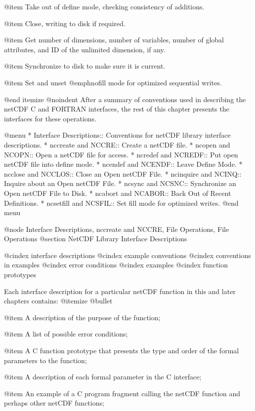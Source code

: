 @item
Take out of define mode, checking consistency of additions.

@item
Close, writing to disk if required.

@item
Get number of dimensions, number of variables, number of global
attributes, and ID of the unlimited dimension, if any.

@item
Synchronize to disk to make sure it is current.

@item
Set and unset @emph{nofill} mode for optimized sequential writes.

@end itemize
@noindent
After a summary of conventions used in describing the netCDF C and
FORTRAN interfaces, the rest of this chapter presents the interfaces for
these operations.

@menu
* Interface Descriptions::   Conventions for netCDF library interface
                             descriptions.
* nccreate and NCCRE::       Create a netCDF file.
* ncopen and NCOPN::         Open a netCDF file for access.
* ncredef and NCREDF::       Put open netCDF file into define mode.
* ncendef and NCENDF::       Leave Define Mode.
* ncclose and NCCLOS::       Close an Open netCDF File.
* ncinquire and NCINQ::      Inquire about an Open netCDF File.
* ncsync and NCSNC::         Synchronize an Open netCDF File to Disk.
* ncabort and NCABOR::       Back Out of Recent Definitions.
* ncsetfill and NCSFIL::     Set fill mode for optimized writes.
@end menu

@node Interface Descriptions, nccreate and NCCRE, File Operations, File Operations
@section NetCDF Library Interface Descriptions

@cindex interface descriptions
@cindex example conventions
@cindex conventions in examples
@cindex error conditions
@cindex examples
@cindex function prototypes

Each interface description for a particular netCDF function in this and
later chapters contains:
@itemize @bullet

@item
A description of the purpose of the function;

@item
A list of possible error conditions;

@item
A C function prototype that presents the type and order of the formal
parameters to the function;

@item
A description of each formal parameter in the C interface;

@item
An example of a C program fragment calling the netCDF function and
perhaps other netCDF functions;


